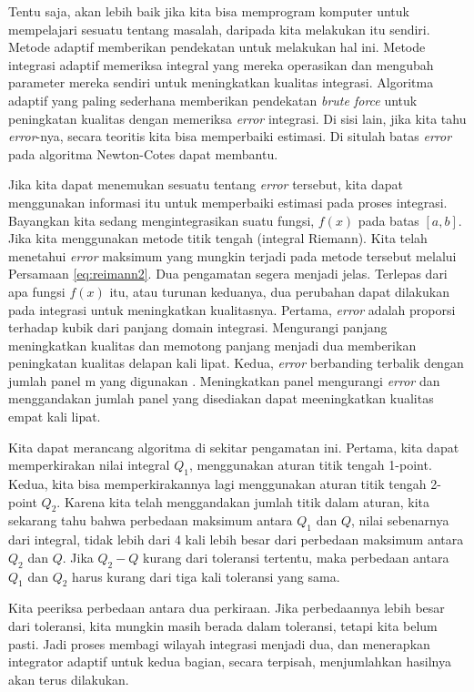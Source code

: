 \documentclass[]{book}
\theoremstyle{definition}
\theoremstyle{definition}
\theoremstyle{definition}
\theoremstyle{remark}
\begin{document}
Tentu saja, akan lebih baik jika kita bisa memprogram komputer untuk mempelajari sesuatu tentang masalah, daripada kita melakukan itu sendiri. Metode adaptif memberikan pendekatan untuk melakukan hal ini. Metode integrasi adaptif memeriksa integral yang mereka operasikan dan mengubah parameter mereka sendiri untuk meningkatkan kualitas integrasi. Algoritma adaptif yang paling sederhana memberikan pendekatan \emph{brute force} untuk peningkatan kualitas dengan memeriksa \emph{error} integrasi. Di sisi lain, jika kita tahu \emph{error}-nya, secara teoritis kita bisa memperbaiki estimasi. Di situlah batas \emph{error} pada algoritma Newton-Cotes dapat membantu.

Jika kita dapat menemukan sesuatu tentang \emph{error} tersebut, kita dapat menggunakan informasi itu untuk memperbaiki estimasi pada proses integrasi. Bayangkan kita sedang mengintegrasikan suatu fungsi, \(f \left(x\right)\) pada batas \(\left[a, b\right]\). Jika kita menggunakan metode titik tengah (integral Riemann). Kita telah menetahui \emph{error} maksimum yang mungkin terjadi pada metode tersebut melalui Persamaan \eqref{eq:reimann2}. Dua pengamatan segera menjadi jelas. Terlepas dari apa fungsi \(f \left(x\right)\) itu, atau turunan keduanya, dua perubahan dapat dilakukan pada integrasi untuk meningkatkan kualitasnya. Pertama, \emph{error} adalah proporsi terhadap kubik dari panjang domain integrasi. Mengurangi panjang meningkatkan kualitas dan memotong panjang menjadi dua memberikan peningkatan kualitas delapan kali lipat. Kedua, \emph{error} berbanding terbalik dengan jumlah panel m yang digunakan . Meningkatkan panel mengurangi \emph{error} dan menggandakan jumlah panel yang disediakan dapat meeningkatkan kualitas empat kali lipat.

Kita dapat merancang algoritma di sekitar pengamatan ini. Pertama, kita dapat memperkirakan nilai integral \(Q_1\), menggunakan aturan titik tengah 1-point. Kedua, kita bisa memperkirakannya lagi menggunakan aturan titik tengah 2-point \(Q_2\). Karena kita telah menggandakan jumlah titik dalam aturan, kita sekarang tahu bahwa perbedaan maksimum antara \(Q_1\) dan \(Q\), nilai sebenarnya dari integral, tidak lebih dari 4 kali lebih besar dari perbedaan maksimum antara \(Q_2\) dan \(Q\). Jika \(Q_2 −Q\) kurang dari toleransi tertentu, maka perbedaan antara \(Q_1\) dan \(Q_2\) harus kurang dari tiga kali toleransi yang sama.

Kita peeriksa perbedaan antara dua perkiraan. Jika perbedaannya lebih besar dari toleransi, kita mungkin masih berada dalam toleransi, tetapi kita belum pasti. Jadi proses membagi wilayah integrasi menjadi dua, dan menerapkan integrator adaptif untuk kedua bagian, secara terpisah, menjumlahkan hasilnya akan terus dilakukan.
\end{document}

